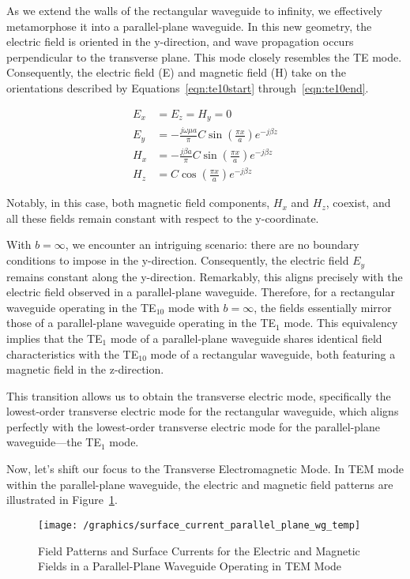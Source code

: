 As we extend the walls of the rectangular waveguide to infinity, we effectively metamorphose it into a parallel-plane waveguide. In this new geometry, the electric field is oriented in the y-direction, and wave propagation occurs perpendicular to the transverse plane. This mode closely resembles the TE mode. Consequently, the electric field (E) and magnetic field (H) take on the orientations described by Equations~\eqref{eqn:te10start} through~\eqref{eqn:te10end}.

\begin{align}
E_x &= E_z = H_y = 0\label{eqn:te10start}\\
E_y &= -\frac{j\omega \mu a}{\pi}C\sin(\frac{\pi x}{a})e^{-j\beta z}\\
H_x &= -\frac{j\beta a}{\pi}C\sin(\frac{\pi x}{a})e^{-j\beta z}\\
H_z &= C\cos(\frac{\pi x}{a})e^{-j\beta z}\label{eqn:te10end}
\end{align}

Notably, in this case, both magnetic field components, $H_x$ and $H_z$, coexist, and all these fields remain constant with respect to the y-coordinate.

With $b=\infty$, we encounter an intriguing scenario: there are no boundary conditions to impose in the y-direction. Consequently, the electric field $E_y$ remains constant along the y-direction. Remarkably, this aligns precisely with the electric field observed in a parallel-plane waveguide. Therefore, for a rectangular waveguide operating in the TE$_{10}$ mode with $b=\infty$, the fields essentially mirror those of a parallel-plane waveguide operating in the TE$_1$ mode. This equivalency implies that the TE$_1$ mode of a parallel-plane waveguide shares identical field characteristics with the TE$_{10}$ mode of a rectangular waveguide, both featuring a magnetic field in the z-direction.

This transition allows us to obtain the transverse electric mode, specifically the lowest-order transverse electric mode for the rectangular waveguide, which aligns perfectly with the lowest-order transverse electric mode for the parallel-plane waveguide—the TE$_1$ mode.

Now, let's shift our focus to the Transverse Electromagnetic Mode. In TEM mode within the parallel-plane waveguide, the electric and magnetic field patterns are illustrated in Figure~\ref{fig:page4}.

\begin{figure}[h]
\centering
\texttt{[image: /graphics/surface\_current\_parallel\_plane\_wg\_temp]}
\caption{Field Patterns and Surface Currents for the Electric and Magnetic Fields in a Parallel-Plane Waveguide Operating in TEM Mode}
\label{fig:page4}
\end{figure}

